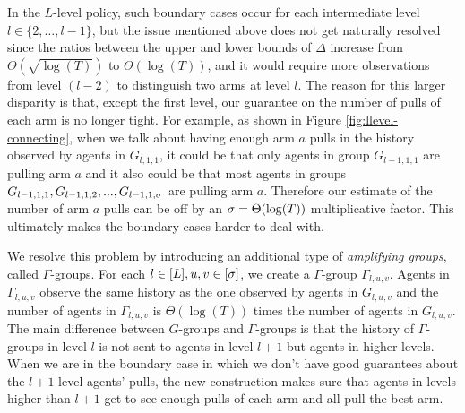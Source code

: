 
In the $L$-level policy, such boundary cases occur for each
intermediate level $l\in \{2, \ldots, l-1\}$, but the issue mentioned
above does not get naturally resolved since the ratios between the
upper and lower bounds of $\Delta$ increase from $\Theta\left(\sqrt{\log(T)}\right)$
to $\Theta(\log(T))$, and it would require more observations from
level $(l-2)$ to distinguish two arms at level $l$. The reason for
this larger disparity is that, except the first level, our guarantee on
the number of pulls of each arm is no longer tight. For example,
as shown in Figure \ref{fig:llevel-connecting}, when we talk about
having enough arm $a$ pulls in the history observed by agents in
$G_{l,1,1}$, it could be that only agents in group $G_{l-1,1,1}$ are
pulling arm $a$ and it also could be that most agents in groups
$G_{l-1,1,1},G_{l-1,1,2},...,G_{l-1,1,\sigma}$ are pulling arm
$a$. Therefore our estimate of the number of arm $a$ pulls can be off
by an $\sigma=\Theta(\log(T))$ multiplicative factor. This ultimately
makes the boundary cases harder to deal with.

We resolve this problem by introducing an additional type of \emph{amplifying groups}, called $\Gamma$-groups. For each $l \in [L], u,v \in [\sigma]$, we create a $\Gamma$-group $\Gamma_{l,u,v}$. Agents in $\Gamma_{l,u,v}$ observe the same history as the one observed by agents in $G_{l,u,v}$ and the number of agents in $\Gamma_{l,u,v}$ is $\Theta(\log(T))$ times the number of agents in $G_{l,u,v}$. The main difference between $G$-groups and $\Gamma$-groups is that the history of $\Gamma$-groups in level $l$ is not sent to agents in level $l+1$ but agents in higher levels. When we are in the boundary case in which we don't have good guarantees about the $l+1$ level agents' pulls, the new construction makes sure that agents in levels higher than $l+1$ get to see enough pulls of each arm and all pull the best arm.
